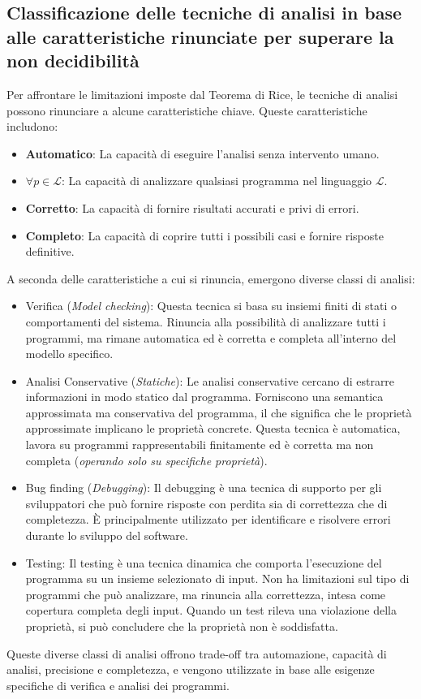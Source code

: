 \subsection{Classificazione delle tecniche di analisi in base alle caratteristiche rinunciate per superare la non decidibilità}
Per affrontare le limitazioni imposte dal Teorema di Rice, le tecniche di
analisi possono rinunciare a alcune caratteristiche chiave. Queste caratteristiche includono:
\begin{itemize}
    \item \textbf{Automatico}: La capacità di eseguire l'analisi senza intervento umano.
    \item \textbf{$\forall p \in \mathcal{L}$}: La capacità di analizzare qualsiasi programma nel linguaggio $\mathcal{L}$.
    \item \textbf{Corretto}: La capacità di fornire risultati accurati e privi di errori.
    \item \textbf{Completo}: La capacità di coprire tutti i possibili casi e fornire risposte definitive.
\end{itemize}
A seconda delle caratteristiche a cui si rinuncia, emergono diverse classi di analisi:
\begin{itemize}
    \item Verifica (\textit{Model checking}): Questa tecnica si basa su insiemi finiti di stati o comportamenti del sistema.
    Rinuncia alla possibilità di analizzare tutti i programmi, ma rimane automatica ed è corretta e completa all'interno del modello specifico.
    \item Analisi Conservative (\textit{Statiche}): Le analisi conservative cercano di estrarre informazioni in modo statico dal programma.
    Forniscono una semantica approssimata ma conservativa del programma, il che significa che le proprietà approssimate implicano le proprietà
    concrete. Questa tecnica è automatica, lavora su programmi
    rappresentabili finitamente ed è corretta ma non completa (\textit{operando solo su specifiche proprietà}).
    \item Bug finding (\textit{Debugging}): Il debugging è una tecnica di supporto per gli sviluppatori
    che può fornire risposte con perdita sia di correttezza che di completezza.
    È principalmente utilizzato per identificare e risolvere errori durante lo sviluppo del software.
    \item Testing: Il testing è una tecnica dinamica che comporta l'esecuzione del programma su un insieme selezionato di
    input. Non ha limitazioni sul tipo di programmi che può analizzare, ma rinuncia alla correttezza, intesa come copertura
    completa degli input. Quando un test rileva una
    violazione della proprietà, si può concludere che la proprietà non è soddisfatta.
\end{itemize}
Queste diverse classi di analisi offrono trade-off tra automazione, capacità di analisi, precisione e completezza,
e vengono utilizzate in base alle esigenze specifiche di verifica e analisi dei programmi.
